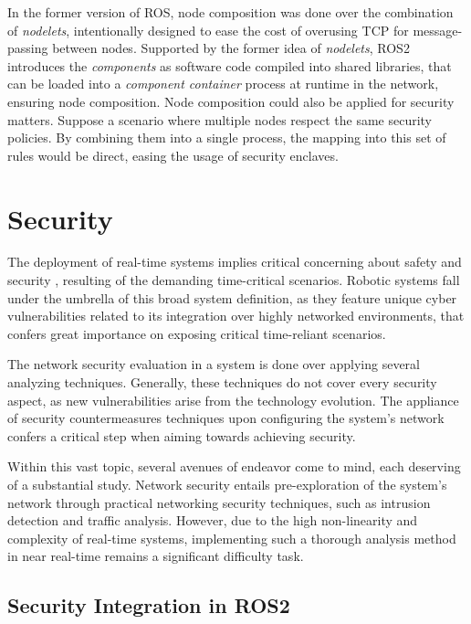 In the former version of ROS, node composition was done over the combination of \textit{nodelets}, intentionally designed to ease the cost of overusing TCP for message-passing between nodes. \cite{ros-nodelets} Supported by the former idea of \textit{nodelets}, ROS2 introduces the \textit{components} as software code compiled into shared libraries, that can be loaded into a \textit{component container} process at runtime in the network, ensuring node composition. Node composition could also be applied for security matters. Suppose a scenario where multiple nodes respect the same security policies. By combining them into a single process, the mapping into this set of rules would be direct, easing the usage of security enclaves. \cite{ros2documentation}
           

\section{Security}

The deployment of real-time systems implies critical concerning about safety and security \cite{maruyama2016exploring}, resulting of the demanding time-critical scenarios. Robotic systems fall under the umbrella of this broad system definition, as they feature unique cyber vulnerabilities related to its integration over highly networked environments, that confers great importance on exposing critical time-reliant scenarios. \cite{mcclean2013preliminary, dieber2017security} 

The network security evaluation in a system is done over applying several analyzing techniques. Generally, these techniques do not cover every security aspect, as new vulnerabilities arise from the technology evolution. \cite{kaeo2004designing}
The appliance of security countermeasures techniques upon configuring the system's network confers a critical step when aiming towards achieving security.

Within this vast topic, several avenues of endeavor come to mind, each deserving of a substantial study. Network security entails pre-exploration of the system's network through practical networking security techniques, such as intrusion detection and traffic analysis. \cite{marin2005network} However, due to the high non-linearity and complexity of real-time systems, implementing such a thorough analysis method in near real-time remains a significant difficulty task. \cite{diao2009design}


\subsection{Security Integration in ROS2}


